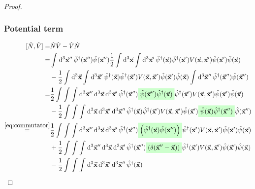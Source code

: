 \documentclass[11pt, a4paper, twoside, openright]{article}
\begin{document}
\begin{proof}
\subsubsection*{Potential term}
\begin{equation*}
\begin{split}
[\hat{N},\hat{V}  ]  =&  \hat{N}\hat{V} - \hat{V}\hat{N}     \\
    =& \int_{}^{} \dd[3]{\va{x}''} \hat{\psi }^\dag (\va{x}'') \hat{\psi }(\va{x}'') \frac{1}{2}  \int_{}^{} \dd[3]{\va{x}}
     \int_{}^{} \dd[3]{\va{x}'} \hat{\psi } ^\dag (\va{x})
     \hat{\psi } ^\dag (\va{x}') V (\va{x},\va{x}') \hat{\psi } (\va{x}') \hat{\psi } (\va{x}) \\
     &-
     \frac{1}{2}  \int_{}^{} \dd[3]{\va{x}}
      \int_{}^{} \dd[3]{\va{x}'} \hat{\psi } ^\dag (\va{x})
      \hat{\psi } ^\dag (\va{x}') V (\va{x},\va{x}') \hat{\psi } (\va{x}') \hat{\psi } (\va{x})
      \int_{}^{} \dd[3]{\va{x}''} \hat{\psi }^\dag (\va{x}'') \hat{\psi }(\va{x}'') \\
    =&
    \frac{1}{2} \int_{}^{} \int_{}^{} \int_{}^{} \dd[3]{\va{x}''} \dd[3]{\va{x}}  \dd[3]{\va{x}'}
    \hat{\psi }^\dag (\va{x}'') \mathcolorbox{green!20}{ \hat{\psi }(\va{x}'') \hat{\psi } ^\dag (\va{x}) }
    \hat{\psi } ^\dag (\va{x}') V (\va{x},\va{x}') \hat{\psi } (\va{x}') \hat{\psi } (\va{x}) \\
    &- \frac{1}{2} \int_{}^{} \int_{}^{} \int_{}^{} \dd[3]{\va{x}} \dd[3]{\va{x}'} \dd[3]{\va{x}''}
    \hat{\psi } ^\dag (\va{x})
    \hat{\psi } ^\dag (\va{x}') V (\va{x},\va{x}') \hat{\psi } (\va{x}') \mathcolorbox{green!20}{\hat{\psi } (\va{x}) \hat{\psi }^\dag (\va{x}'')} \hat{\psi }(\va{x}'') \\
     \overset{\eqref{eq:commutator}}{=} &
    \frac{1}{2} \int_{}^{} \int_{}^{} \int_{}^{} \dd[3]{\va{x}''} \dd[3]{\va{x}}  \dd[3]{\va{x}'}
    \hat{\psi }^\dag (\va{x}'') \mathcolorbox{green!20}{ \qty(  \hat{\psi } ^\dag (\va{x}) \hat{\psi }(\va{x}'')  ) }
    \hat{\psi } ^\dag (\va{x}') V (\va{x},\va{x}') \hat{\psi } (\va{x}') \hat{\psi } (\va{x}) \\
    &+
    \frac{1}{2} \int_{}^{} \int_{}^{} \int_{}^{} \dd[3]{\va{x}''} \dd[3]{\va{x}}  \dd[3]{\va{x}'}
    \hat{\psi }^\dag (\va{x}'') \mathcolorbox{green!20}{ \qty(\delta (\va{x}''-\va{x}) ) }
    \hat{\psi } ^\dag (\va{x}') V (\va{x},\va{x}') \hat{\psi } (\va{x}') \hat{\psi } (\va{x}) \\
    &-
    \frac{1}{2} \int_{}^{} \int_{}^{} \int_{}^{} \dd[3]{\va{x}} \dd[3]{\va{x}'} \dd[3]{\va{x}''}
    \hat{\psi } ^\dag (\va{x})

\end{split}
\end{equation*}
\end{proof}
\end{document}
